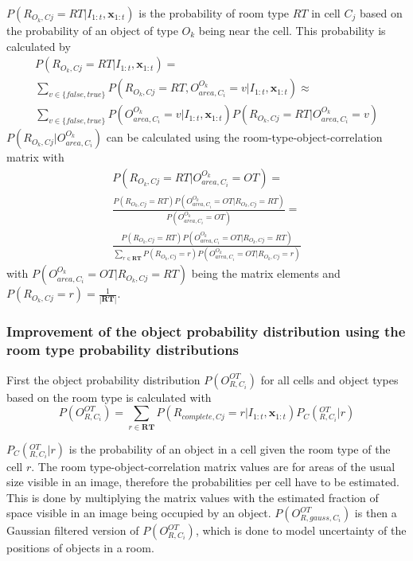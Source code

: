 $P(R_{O_k,Cj}=RT|I_{1:t},\mathbf{x}_{1:t})$ is the probability of room type $RT$ in cell $C_j$ based on the probability of an object of type $O_k$ being near the cell. This probability is calculated by
\begin{multline}
P(R_{O_k,Cj}=RT|I_{1:t},\mathbf{x}_{1:t}) = \\ \sum_{v \in \{false,true\}}P(R_{O_k,Cj}=RT,O_{area, C_i}^{O_k}=v|I_{1:t},\mathbf{x}_{1:t}) \approx \\ \sum_{v \in \{false,true\}} P(O_{area, C_i}^{O_k}=v|I_{1:t},\mathbf{x}_{1:t})P(R_{O_k,Cj}=RT|O_{area, C_i}^{O_k}=v)
\end{multline}
$P(R_{O_k,Cj}|O_{area, C_i}^{O_k})$ can be calculated using the room-type-object-correlation matrix with 
\begin{multline}
P(R_{O_k,Cj}=RT|O_{area, C_i}^{O_k}=OT)=\\ \frac{P(R_{O_k,Cj}=RT)P(O_{area, C_i}^{O_k}=OT|R_{O_k,Cj}=RT)}{P(O_{area, C_i}^{O_k}=OT)} = \\ \frac{P(R_{O_k,Cj}=RT)P(O_{area, C_i}^{O_k}=OT|R_{O_k,Cj}=RT)}{\sum_{r \in \mathbf{RT}}P(R_{O_k,Cj}=r)P(O_{area, C_i}^{O_k}=OT|R_{O_k,Cj}=r)}
\end{multline}
with $P(O_{area, C_i}^{O_k}=OT|R_{O_k,Cj}=RT)$ being the matrix elements and $P(R_{O_k,Cj}=r) = \frac{1}{|\mathbf{RT}|}$.


\subsubsection{Improvement of the object probability distribution using the room type probability distributions}

First the object probability distribution $P(O_{R,C_i}^{OT})$ for all cells and object types based on the room type is calculated with
\begin{equation}
P(O_{R,C_i}^{OT})=\sum_{r\in \mathbf{RT}}P(R_{complete,Cj}=r|I_{1:t},\mathbf{x}_{1:t})P_C(_{R,C_i}^{OT}|r)
\end{equation}

$P_C(_{R,C_i}^{OT}|r)$ is the probability of an object in a cell given the room type of the cell $r$. The room type-object-correlation matrix values are for areas of the usual size visible in an image, therefore the probabilities per cell have to be estimated. This is done by multiplying the matrix values with the estimated fraction of space visible in an image being occupied by an object. $P(O_{R,gauss,C_i}^{OT})$ is then a Gaussian filtered version of $P(O_{R,C_i}^{OT})$, which is done to model uncertainty of the positions of objects in a room. 


